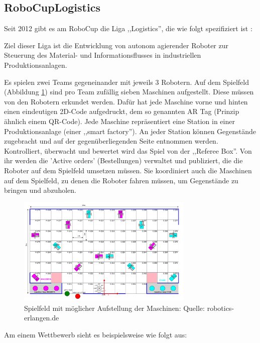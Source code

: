 \subsection{RoboCupLogistics}
Seit 2012 gibt es am RoboCup die Liga ,,Logistics'', die wie folgt spezifiziert ist \cite{wikipedia-robocup}:
\begin{formal}
	Ziel dieser Liga ist die Entwicklung von autonom agierender Roboter zur Steuerung des Material- und Informationsflusses in industriellen Produktionsanlagen.
\end{formal}
Es spielen zwei Teams gegeneinander mit jeweils 3 Robotern. Auf dem  Spielfeld (Abbildung \ref{fig:robocup_spielfeld}) sind pro Team zufällig sieben Maschinen  aufgestellt. Diese müssen von den Robotern erkundet werden. Dafür hat jede Maschine vorne und hinten einen eindeutigen 2D-Code aufgedruckt, dem so genannten AR Tag (Prinzip ähnlich einem QR-Code). Jede Maschine repräsentiert eine Station in einer Produktionsanlage (einer ,,smart factory''). An jeder Station können Gegenstände zugebracht und auf der gegenüberliegenden Seite entnommen werden. Kontrolliert, überwacht und bewertet wird das Spiel von der ,,Referee Box''. Von ihr werden die 'Active orders' (Bestellungen) verwaltet und publiziert, die die Roboter auf dem Spielfeld umsetzen müssen. Sie koordiniert auch die Maschinen auf dem Spielfeld, zu denen die Roboter fahren müssen, um Gegenstände zu bringen und abzuholen.
\begin{figure}[H]
	\centering
	\includegraphics[width=0.75\textwidth]{img/robocup-spielfeld-2d.png}
	\caption{Spielfeld mit möglicher Aufstellung der Maschinen: Quelle: robotics-erlangen.de \cite{robotics-erlangen.de}}
	\label{fig:robocup_spielfeld}
\end{figure}
Am einem Wettbewerb sieht es beispielsweise wie folgt aus:
